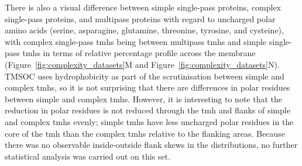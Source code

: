There is also a visual difference between simple single\--pass proteins, complex single\--pass proteins, and multipass proteins with regard to uncharged polar amino acids (serine, asparagine, glutamine, threonine, tyrosine, and cysteine), with complex single\--pass \gls{tmh}s being between multipass \gls{tmh}s and simple single\--pass \gls{tmh}s in terms of relative percentage profile across the membrane (Figure~\ref{fig:complexity_datasets}M and Figure~\ref{fig:complexity_datasets}N).
TMSOC uses hydrophobicity as part of the scrutinisation between simple and complex \gls{tmh}s, so it is not surprising that there are differences in polar residues between simple and complex \gls{tmh}s.
However, it is interesting to note that the reduction in polar residues is not reduced through the \gls{tmh} and flanks of simple and complex \gls{tmh}s evenly; simple \gls{tmh}s have less uncharged polar residues in the core of the \gls{tmh} than the complex \gls{tmh}s relative to the flanking areas.
Because there was no observable inside\--outside flank skews in the distributions, no further statistical analysis was carried out on this set.


